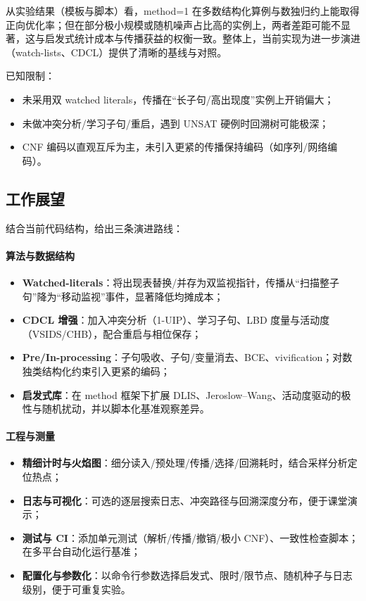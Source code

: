 \documentclass[UTF8]{ctexart}
\begin{document}
从实验结果（模板与脚本）看，method=1 在多数结构化算例与数独归约上能取得正向优化率；但在部分极小规模或随机噪声占比高的实例上，两者差距可能不显著，这与启发式统计成本与传播获益的权衡一致。整体上，当前实现为进一步演进（watch-lists、CDCL）提供了清晰的基线与对照。

已知限制：
\begin{itemize}
  \item 未采用双 watched literals，传播在“长子句/高出现度”实例上开销偏大；
  \item 未做冲突分析/学习子句/重启，遇到 UNSAT 硬例时回溯树可能极深；
  \item CNF 编码以直观互斥为主，未引入更紧的传播保持编码（如序列/网络编码）。
\end{itemize}

\subsection{工作展望}
结合当前代码结构，给出三条演进路线：
\paragraph{算法与数据结构}
\begin{itemize}
  \item \textbf{Watched-literals}：将出现表替换/并存为双监视指针，传播从“扫描整子句”降为“移动监视”事件，显著降低均摊成本；
  \item \textbf{CDCL 增强}：加入冲突分析（1-UIP）、学习子句、LBD 度量与活动度（VSIDS/CHB），配合重启与相位保存；
  \item \textbf{Pre/In-processing}：子句吸收、子句/变量消去、BCE、vivification；对数独类结构化约束引入更紧的编码；
  \item \textbf{启发式库}：在 method 框架下扩展 DLIS、Jeroslow–Wang、活动度驱动的极性与随机扰动，并以脚本化基准观察差异。
\end{itemize}

\paragraph{工程与测量}
\begin{itemize}
  \item \textbf{精细计时与火焰图}：细分读入/预处理/传播/选择/回溯耗时，结合采样分析定位热点；
  \item \textbf{日志与可视化}：可选的逐层搜索日志、冲突路径与回溯深度分布，便于课堂演示；
  \item \textbf{测试与 CI}：添加单元测试（解析/传播/撤销/极小 CNF）、一致性检查脚本；在多平台自动化运行基准；
  \item \textbf{配置化与参数化}：以命令行参数选择启发式、限时/限节点、随机种子与日志级别，便于可重复实验。
\end{itemize}
\end{document}
